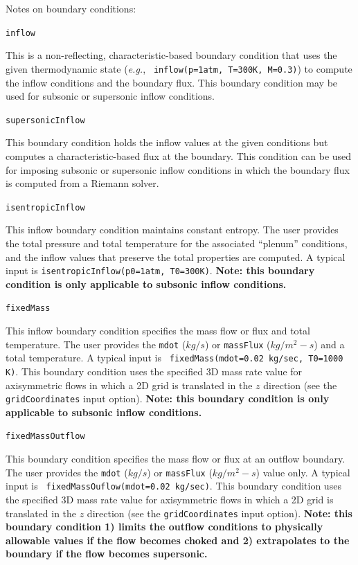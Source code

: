 \documentclass{article}
\begin{document}
  Notes on boundary conditions:

  \begin{list}{}{}

    
  \item {\tt inflow}

    This is a non-reflecting, characteristic-based boundary condition
    that uses the given thermodynamic state ({\it{e.g.}}, {\tt
      inflow(p=1atm, T=300K, M=0.3)}) to
    compute the inflow conditions and the boundary flux.  This
    boundary condition may be used for subsonic or supersonic inflow
    conditions.
    
  \item {\tt supersonicInflow}

    This boundary condition holds the inflow values at the given
    conditions but computes a characteristic-based flux at the
    boundary.  This condition can be used for imposing subsonic or
    supersonic inflow conditions in which the boundary flux is
    computed from a Riemann solver.

  \item {\tt isentropicInflow}

    This inflow boundary condition maintains constant entropy.  The
    user provides the total pressure and total temperature for the
    associated ``plenum'' conditions, and the inflow values that
    preserve the total properties are computed.  A typical input is
    {\tt isentropicInflow(p0=1atm, T0=300K)}.  {\bf Note: this
      boundary condition is only applicable to subsonic inflow
      conditions.}

  \item {\tt fixedMass}

    This inflow boundary condition specifies the mass flow or flux
    and total temperature.  The user provides the
    {\tt mdot} ($kg/s$) or {\tt massFlux} ($kg/m^2-s$) and
    a total temperature.  A typical input is {\tt
    fixedMass(mdot=0.02 kg/sec, T0=1000 K)}.  This boundary condition
    uses the specified 3D mass rate value for axisymmetric flows in which a 2D grid
    is translated in the $z$ direction (see the {\tt gridCoordinates} input option).  {\bf Note:
    this boundary condition is only applicable to subsonic inflow conditions.}

  \item {\tt fixedMassOutflow}

    This boundary condition specifies the mass flow or flux
    at an outflow boundary.  The user provides the
    {\tt mdot} ($kg/s$) or {\tt massFlux} ($kg/m^2-s$) value only.  A typical input is {\tt
    fixedMassOuflow(mdot=0.02 kg/sec)}.  This boundary condition
    uses the specified 3D mass rate value for axisymmetric flows in which a 2D grid
    is translated in the $z$ direction (see the {\tt gridCoordinates} input option).  {\bf Note:
    this boundary condition 1) limits the outflow conditions to physically allowable values if the flow
    becomes choked and 2) extrapolates to the boundary if the flow becomes supersonic.}


\end{list}
\end{document}
